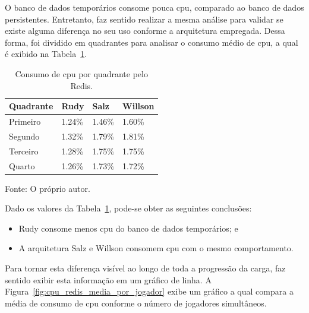O banco de dados temporários consome pouca \ac{cpu}, comparado ao banco de dados persistentes.
%
Entretanto, faz sentido realizar a mesma análise para validar se existe alguma diferença no seu uso conforme a arquitetura empregada.
%
Dessa forma, foi dividido em quadrantes para analisar o consumo médio de \ac{cpu}, a qual é exibido na Tabela~\ref{tab:cpu_redis_media_quadrantes}.

\begin{table}[htb!]
\centering
\begin{adjustbox}{max width=\textwidth}
\caption{Consumo de \ac{cpu} por quadrante pelo Redis.}
\label{tab:cpu_redis_media_quadrantes}
\begin{tabular}{|l|l|l|l|}

\hline

Quadrante & Rudy    & Salz    & Willson \\ \hline

Primeiro  & 1.24\% & 1.46\% & 1.60\% \\ \hline

Segundo   & 1.32\% & 1.79\% & 1.81\% \\ \hline

Terceiro  & 1.28\% & 1.75\% & 1.75\% \\ \hline

Quarto    & 1.26\% & 1.73\% & 1.72\% \\ \hline

\end{tabular}

\end{adjustbox}

Fonte: O próprio autor.
\end{table}

Dado os valores da Tabela~\ref{tab:cpu_redis_media_quadrantes}, pode-se obter as seguintes conclusões:

\begin{itemize}
 \item Rudy consome menos \ac{cpu} do banco de dados temporários; e
 \item A arquitetura Salz e Willson consomem \ac{cpu} com o mesmo comportamento.
\end{itemize}

Para tornar esta diferença visível ao longo de toda a progressão da carga, faz sentido exibir esta informação em um gráfico de linha.
%
A Figura~\ref{fig:cpu_redis_media_por_jogador} exibe um gráfico a qual compara a média de consumo de \ac{cpu} conforme o número de jogadores simultâneos.

